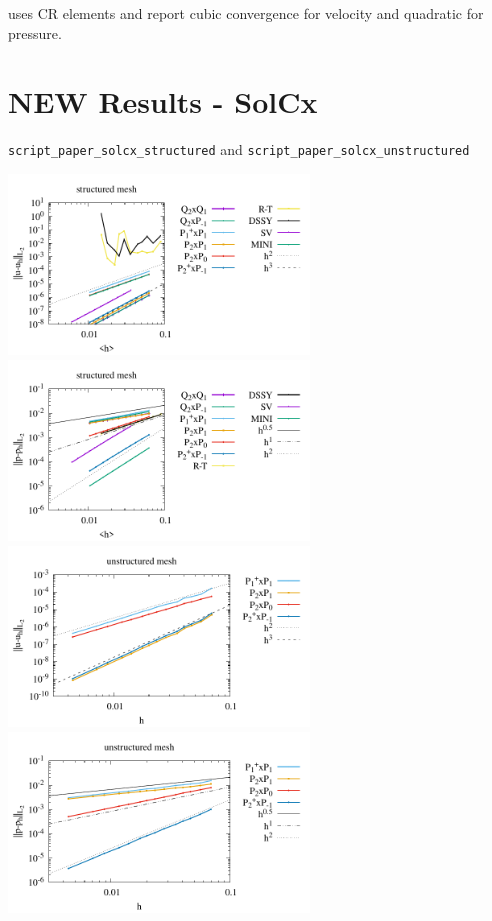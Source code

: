 \textcite{demh19} uses CR elements and report cubic convergence for velocity and quadratic for pressure.


\newpage
\section*{NEW Results - SolCx}

{\tt script\_paper\_solcx\_structured} and {\tt script\_paper\_solcx\_unstructured}

\begin{center}
\includegraphics[width=8cm]{python_codes/fieldstone_120/paperresults/solcx_structured_errorsV.pdf}
\includegraphics[width=8cm]{python_codes/fieldstone_120/paperresults/solcx_structured_errorsP.pdf}\\
\includegraphics[width=8cm]{python_codes/fieldstone_120/paperresults/solcx_unstructured_errorsV.pdf}
\includegraphics[width=8cm]{python_codes/fieldstone_120/paperresults/solcx_unstructured_errorsP.pdf}
\end{center}

